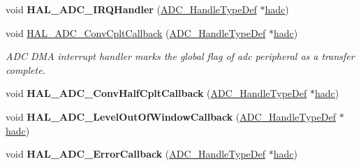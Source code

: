 \begin{DoxyCompactItemize}
\item 
\hypertarget{group___a_d_c___exported___functions___group2_ga28aaa5662eced92c5a4d23d8bd6b29ca}{void {\bfseries H\-A\-L\-\_\-\-A\-D\-C\-\_\-\-I\-R\-Q\-Handler} (\hyperlink{struct_a_d_c___handle_type_def}{A\-D\-C\-\_\-\-Handle\-Type\-Def} $\ast$\hyperlink{stm32l1xx__it_8c_a62fcafba91cf315db7e0e0c8f22c656f}{hadc})}\label{group___a_d_c___exported___functions___group2_ga28aaa5662eced92c5a4d23d8bd6b29ca}

\item 
void \hyperlink{group___a_d_c___exported___functions___group2_gaf20a88180db1113be1e89266917d148b}{H\-A\-L\-\_\-\-A\-D\-C\-\_\-\-Conv\-Cplt\-Callback} (\hyperlink{struct_a_d_c___handle_type_def}{A\-D\-C\-\_\-\-Handle\-Type\-Def} $\ast$\hyperlink{stm32l1xx__it_8c_a62fcafba91cf315db7e0e0c8f22c656f}{hadc})
\begin{DoxyCompactList}\small\item\em A\-D\-C D\-M\-A interrupt handler marks the global flag of adc peripheral as a transfer complete. \end{DoxyCompactList}\item 
\hypertarget{group___a_d_c___exported___functions___group2_gad7e3dafc08886b97b9c9e23267645b9e}{void {\bfseries H\-A\-L\-\_\-\-A\-D\-C\-\_\-\-Conv\-Half\-Cplt\-Callback} (\hyperlink{struct_a_d_c___handle_type_def}{A\-D\-C\-\_\-\-Handle\-Type\-Def} $\ast$\hyperlink{stm32l1xx__it_8c_a62fcafba91cf315db7e0e0c8f22c656f}{hadc})}\label{group___a_d_c___exported___functions___group2_gad7e3dafc08886b97b9c9e23267645b9e}

\item 
\hypertarget{group___a_d_c___exported___functions___group2_ga8cf5c59c6355fe7cf3c10816c761b9c2}{void {\bfseries H\-A\-L\-\_\-\-A\-D\-C\-\_\-\-Level\-Out\-Of\-Window\-Callback} (\hyperlink{struct_a_d_c___handle_type_def}{A\-D\-C\-\_\-\-Handle\-Type\-Def} $\ast$\hyperlink{stm32l1xx__it_8c_a62fcafba91cf315db7e0e0c8f22c656f}{hadc})}\label{group___a_d_c___exported___functions___group2_ga8cf5c59c6355fe7cf3c10816c761b9c2}

\item 
\hypertarget{group___a_d_c___exported___functions___group2_gadea1a55c5199d5cb4cfc1fdcd32be1b2}{void {\bfseries H\-A\-L\-\_\-\-A\-D\-C\-\_\-\-Error\-Callback} (\hyperlink{struct_a_d_c___handle_type_def}{A\-D\-C\-\_\-\-Handle\-Type\-Def} $\ast$\hyperlink{stm32l1xx__it_8c_a62fcafba91cf315db7e0e0c8f22c656f}{hadc})}\label{group___a_d_c___exported___functions___group2_gadea1a55c5199d5cb4cfc1fdcd32be1b2}

\end{DoxyCompactItemize}


